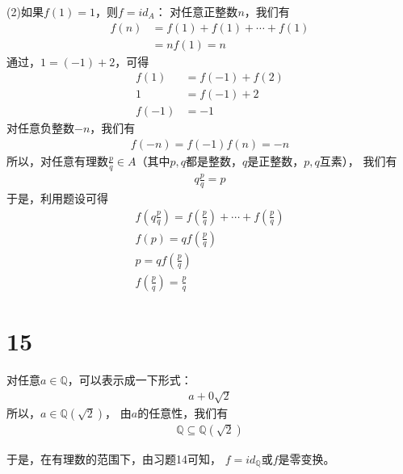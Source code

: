 \documentclass{article}
\begin{document}
\begin{itemize}
            (2)如果$f(1) = 1$，则$f = id_A$：
            对任意正整数$n$，我们有
            \begin{align*}
                  f(n) & = f(1) + f(1) + \cdots + f(1) \\
                       & = n f(1) = n
            \end{align*}
            通过，$1 = (-1) + 2$，可得
            \begin{align*}
                  f(1)  & = f(-1) + f(2) \\
                  1     & = f(-1) + 2    \\
                  f(-1) & = -1
            \end{align*}
            对任意负整数$-n$，我们有
            \begin{align*}
                  f(-n) = f(-1) f(n) = -n
            \end{align*}
            所以，对任意有理数$\frac{p}{q} \in A$（其中$p, q$都是整数，$q$是正整数，$p,q$互素），
            我们有
            \begin{align*}
                  q \frac{p}{q} = p
            \end{align*}
            于是，利用题设可得
            \begin{align*}
                  f(q \frac{p}{q}) = f(\frac{p}{q}) + \cdots + f(\frac{p}{q}) \\
                  f(p) = q f(\frac{p}{q})                                     \\
                  p = q f(\frac{p}{q})                                        \\
                  f(\frac{p}{q}) = \frac{p}{q}
            \end{align*}
\end{itemize}

\section*{15}

对任意$a \in \mathbb{Q}$，可以表示成一下形式：
\begin{align*}
      a + 0\sqrt{2}
\end{align*}
所以，$a \in \mathbb{Q}(\sqrt{2})$，
由$a$的任意性，我们有
\begin{align*}
      \mathbb{Q} \subseteq \mathbb{Q}(\sqrt{2})
\end{align*}

于是，在有理数的范围下，由习题14可知，
$f = id_{\mathbb{Q}}$或$f$是零变换。
\end{document}
